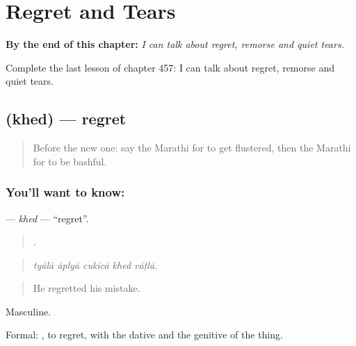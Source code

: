 
\chapter{Regret and Tears}
\label{ch:mr-regret-and-tears}

\begin{chapteropening}
\textbf{By the end of this chapter:} \emph{I can talk about regret, remorse and quiet tears.}

Complete the last lesson of chapter 457: I can talk about regret, remorse and quiet tears.
\end{chapteropening}

\section[\texorpdfstring{\mr{खेद} (khed)}{खेद (khed)}]{ (khed) — regret}

\label{lesson:MR-C457-khed}



\begin{quote}
Before the new one: say the Marathi for to get flustered, then the Marathi for to be bashful.
\end{quote}

\subsection*{You'll want to know: }
\textbf{} — \emph{khed} — \textquotedblleft{}regret\textquotedblright{}.

\begin{quote}
    .
\end{quote}

\begin{quote}
\emph{tyālā āplyā cukīcā khed vāṭlā.}
\end{quote}

\begin{quote}
He regretted his mistake.
\end{quote}

Masculine.

Formal:  , to regret, with the dative and the genitive of the thing.


